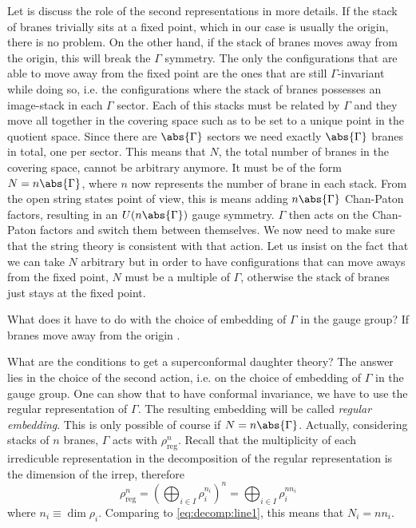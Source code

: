 \documentclass{worksheetclass}
\begin{document}
    Let is discuss the role of the second representations in more details. If the stack of branes trivially sits at a fixed point, which in our case is usually the origin, there is no problem. On the other hand, if the stack of branes moves away from the origin, this will break the $\Gamma$ symmetry. The only the configurations that are able to move away from the fixed point are the ones that are still $\Gamma$-invariant while doing so, i.e. the configurations where the stack of branes possesses an image-stack in each $\Gamma$ sector. Each of this stacks must be related by $\Gamma$ and they move all together in the covering space such as to be set to a unique point in the quotient space. Since there are $\abs{\Gamma}$ sectors we need exactly $\abs{\Gamma}$ branes in total, one per sector. This means that $N$, the total number of branes in the covering space, cannot be arbitrary anymore. It must be of the form $N=n\abs{\Gamma}$, where $n$ now represents the number of brane in each stack. From the open string states point of view, this is means adding $n\abs{\Gamma}$ Chan-Paton factors, resulting in an $U(n\abs{\Gamma})$ gauge symmetry. $\Gamma$ then acts on the Chan-Paton factors and switch them between themselves. We now need to make sure that the string theory is consistent with that action. Let us insist on the fact that we can take $N$ arbitrary but in order to have configurations that can move aways from the fixed point, $N$ must be a multiple of $\Gamma$, otherwise the stack of branes just stays at the fixed point.

    What does it have to do with the choice of embedding of $\Gamma$ in the gauge group? If branes move away from the origin .
    
    What are the conditions to get a superconformal daughter theory? The answer lies in the choice of the second action, i.e. on the choice of embedding of $\Gamma$ in the gauge group. One can show \cite{vafa1998} that to have conformal invariance, we have to use the regular representation of $\Gamma$. The resulting embedding will be called \emph{regular embedding}. This is only possible of course if $N=n\abs{\Gamma}$. Actually, considering stacks of $n$ branes, $\Gamma$ acts with $\rho^n_{\text{reg}}$. Recall that the multiplicity of each irredicuble representation in the decomposition of the regular representation is the dimension of the irrep, therefore
    \begin{equation}
        \rho^n_{\text{reg}} = \left(\bigoplus_{i\in I}\rho^{n_i}_i\right)^n = \bigoplus_{i\in I}\rho^{nn_i}_i
    \end{equation}
    where $n_i\equiv\dim\rho_i$. Comparing to \eqref{eq:decomp:line1}, this means that $N_i=nn_i$.
    
\end{document}

